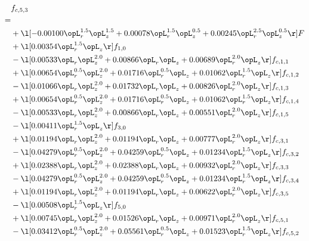 \begin{alignat}{2} 
\label{eq:f_53_1} 
& f_{c,5,3} \nonumber \\ 
 = \\ 
& + \l[  -0.00100 \opL_r^{1.5} \opL_z^{1.5} +  0.00078 \opL_r^{1.5} \opL_z^{0.5} +  0.00245 \opL_r^{2.5} \opL_z^{0.5}  \r] F \nonumber \\ 
& + \l[  0.00354 \opL_r^{1.5} \opL_z  \r] f_{1,0} \nonumber \\ 
& - \l[  0.00533 \opL_r \opL_z^{2.0} +  0.00866 \opL_r \opL_z +  0.00689 \opL_r^{2.0} \opL_z  \r] f_{c,1,1} \nonumber \\ 
& + \l[  0.00654 \opL_r^{0.5} \opL_z^{2.0} +  0.01716 \opL_r^{0.5} \opL_z +  0.01062 \opL_r^{1.5} \opL_z  \r] f_{c,1,2} \nonumber \\ 
& - \l[  0.01066 \opL_r \opL_z^{2.0} +  0.01732 \opL_r \opL_z +  0.00826 \opL_r^{2.0} \opL_z  \r] f_{c,1,3} \nonumber \\ 
& + \l[  0.00654 \opL_r^{0.5} \opL_z^{2.0} +  0.01716 \opL_r^{0.5} \opL_z +  0.01062 \opL_r^{1.5} \opL_z  \r] f_{c,1,4} \nonumber \\ 
& - \l[  0.00533 \opL_r \opL_z^{2.0} +  0.00866 \opL_r \opL_z +  0.00551 \opL_r^{2.0} \opL_z  \r] f_{c,1,5} \nonumber \\ 
& - \l[  0.00411 \opL_r^{1.5} \opL_z  \r] f_{3,0} \nonumber \\ 
& + \l[  0.01194 \opL_r \opL_z^{2.0} +  0.01194 \opL_r \opL_z +  0.00777 \opL_r^{2.0} \opL_z  \r] f_{c,3,1} \nonumber \\ 
& - \l[  0.04279 \opL_r^{0.5} \opL_z^{2.0} +  0.04259 \opL_r^{0.5} \opL_z +  0.01234 \opL_r^{1.5} \opL_z  \r] f_{c,3,2} \nonumber \\ 
& + \l[  0.02388 \opL_r \opL_z^{2.0} +  0.02388 \opL_r \opL_z +  0.00932 \opL_r^{2.0} \opL_z  \r] f_{c,3,3} \nonumber \\ 
& - \l[  0.04279 \opL_r^{0.5} \opL_z^{2.0} +  0.04259 \opL_r^{0.5} \opL_z +  0.01234 \opL_r^{1.5} \opL_z  \r] f_{c,3,4} \nonumber \\ 
& + \l[  0.01194 \opL_r \opL_z^{2.0} +  0.01194 \opL_r \opL_z +  0.00622 \opL_r^{2.0} \opL_z  \r] f_{c,3,5} \nonumber \\ 
& - \l[  0.00508 \opL_r^{1.5} \opL_z  \r] f_{5,0} \nonumber \\ 
& + \l[  0.00745 \opL_r \opL_z^{2.0} +  0.01526 \opL_r \opL_z +  0.00971 \opL_r^{2.0} \opL_z  \r] f_{c,5,1} \nonumber \\ 
& - \l[  0.03412 \opL_r^{0.5} \opL_z^{2.0} +  0.05561 \opL_r^{0.5} \opL_z +  0.01523 \opL_r^{1.5} \opL_z  \r] f_{c,5,2} \nonumber \\ 

\end{alignat}

